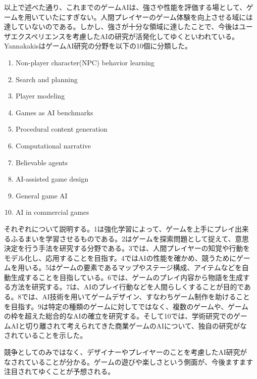 \documentclass[12pt]{jarticle}
\begin{document}
以上で述べた通り、これまでのゲームAIは、強さや性能を評価する場として、ゲームを用いていたにすぎない。人間プレイヤーのゲーム体験を向上させる域には達していないのである。しかし、強さが十分な領域に達したことで、今後はユーザエクスペリエンスを考慮したAIの研究が活発化してゆくといわれている\cite{miyake_genzai, ikeda}。YannakakisはゲームAI研究の分野を以下の10個に分類した\cite{yan_panorama}。
\begin{enumerate}
\item Non-player character(NPC) behavior learning
\item Search and planning
\item Player modeling
\item Games as AI benchmarks
\item Procedural content generation
\item Computational narrative
\item Believable agents
\item AI-assisted game design
\item General game AI
\item AI in commercial games
\end{enumerate}

それぞれについて説明する。1は強化学習によって、ゲームを上手にプレイ出来るふるまいを学習させるものである。2はゲームを探索問題として捉えて、意思決定を行う手法を研究する分野である。3では、人間プレイヤーの知覚や行動をモデル化し、応用することを目指す。4ではAIの性能を確かめ、競うためにゲームを用いる。5はゲームの要素であるマップやステージ構成、アイテムなどを自動生成することを目指している。6では、ゲームのプレイ内容から物語を生成する方法を研究する。7は、AIのプレイ行動などを人間らしくすることが目的である。8では、AI技術を用いてゲームデザイン、すなわちゲーム制作を助けることを目指す。9は特定の種類のゲームに対してではなく、複数のゲームや、ゲームの枠を超えた総合的なAIの確立を研究する。そして10では、学術研究でのゲームAIと切り離されて考えられてきた商業ゲームのAIについて、独自の研究がなされていることを示した。

競争としてのみではなく、デザイナーやプレイヤーのことを考慮したAI研究がなされていることが分かる。ゲームの遊びや楽しさという側面が、今後ますます注目されてゆくことが予想される。
\end{document}
